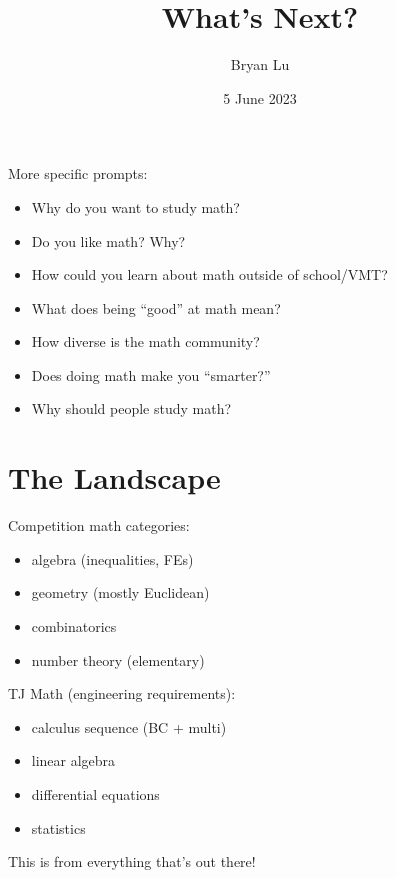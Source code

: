 \documentclass[12pt]{article}
\title{What's Next?}
\author{Bryan Lu}
\date{5 June 2023} %
\begin{document}
\maketitle


\noindent More specific prompts:
\begin{center} 
\begin{multicols}{2}
  \begin{itemize}
    \item Why do you want to study math?
    \item Do you like math? Why? 
    \item How could you learn about math outside of school/VMT?
    \item What does being ``good'' at math mean?
    \item How diverse is the math community?  
    \item Does doing math make you ``smarter?''
    \item Why should people study math?
  \end{itemize}
\end{multicols}
\end{center}

\section{The Landscape} %
\begin{center}
  \begin{minipage}{0.45\textwidth}
    Competition math categories: 
    \begin{itemize}
      \item algebra (inequalities, FEs)
      \item geometry (mostly Euclidean)
      \item combinatorics 
      \item number theory (elementary) 
    \end{itemize}
  \end{minipage}
  \begin{minipage}{0.45\textwidth}
    TJ Math (engineering requirements): 
  \begin{itemize}
    \item calculus sequence (BC + multi)  
    \item linear algebra 
    \item differential equations
    \item statistics 
  \end{itemize}
  \end{minipage}
\end{center}
This is  from everything that's out there! 
\end{document}
